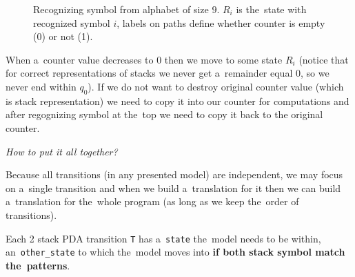 \documentclass[english,shortabstract,mgr]{iithesis}
\begin{document}
\begin{figure}[H]
\centering
{}

\caption{Recognizing symbol from alphabet of size $9$. $R_i$ is the~state with recognized
  symbol $i$, labels on paths define whether counter is empty (0) or not (1).}
\label{fig:check}

\end{figure}

When a~counter value decreases to $0$ then we move to some state $R_i$ (notice that for
correct representations of stacks we never get a~remainder equal $0$, so we never end within $q_0$).
If we do not want to destroy original counter value (which is stack representation) we need
to copy it into our counter for computations and after regognizing symbol at the~top
we need to copy it back to the original counter.

\textit{How to put it all together?}

Because all transitions (in any presented model) are independent, we may focus on a~single
transition and when we build a~translation for it then we can build a~translation for the~whole
program (as long as we keep the~order of transitions).

Each 2 stack PDA transition \texttt{T} has a~\texttt{state} the~model needs to be within,
an~\texttt{other\_state} to which the~model moves into \textbf{if both stack symbol match
the~patterns}.
\end{document}
